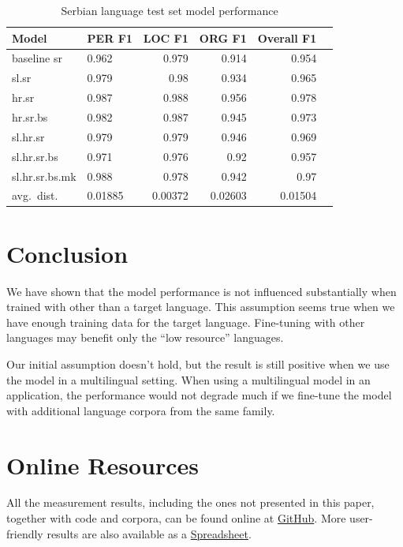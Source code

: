\documentclass[sigconf]{acmart}
\begin{document}
\begin{table}[H]
  \caption{Serbian language test set model performance}
  \label{tab:eval_sr}
  \begin{tabular}{llrrrr}
    \toprule
    Model&PER F1&LOC F1&ORG F1&Overall F1\\
    \midrule
    baseline sr&0.962&0.979&0.914&0.954\\
    \midrule
    sl.sr&0.979&0.98&0.934&0.965\\
    hr.sr&0.987&0.988&0.956&0.978\\
    hr.sr.bs&0.982&0.987&0.945&0.973\\
    sl.hr.sr&0.979&0.979&0.946&0.969\\
    sl.hr.sr.bs&0.971&0.976&0.92&0.957\\
    sl.hr.sr.bs.mk&0.988&0.978&0.942&0.97\\
    \midrule
    avg.\ dist.&0.01885&0.00372&0.02603&0.01504\\
    \bottomrule
  \end{tabular}
\end{table}

\section{Conclusion}
\label{sec:conclusion}
We have shown that the model performance is not influenced substantially when trained with other than a target language.
This assumption seems true when we have enough training data for the target language.
Fine-tuning with other languages may benefit only the ``low resource'' languages.

Our initial assumption doesn't hold, but the result is still positive when we use the model in a multilingual setting.
When using a multilingual model in an application, the performance would not degrade much if we fine-tune the model with additional language corpora from the same family.






\appendix

\section{Online Resources}
\label{sec:online-resources}

All the measurement results, including the ones not presented in this paper, together with code and corpora, can be found online at
{\color{blue}\href{https://github.com/ivlcic/trans-ner}{GitHub}}.
More user-friendly results are also available as a
{\color{blue}\href{https://docs.google.com/spreadsheets/d/16UaPR-qneNN8mlzjNkjc9kdry2eQl4J84t3EfDOtBj0/edit?usp=sharing}{Spreadsheet}}.
\end{document}
